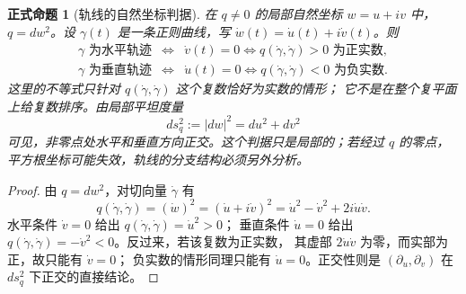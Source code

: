 \documentclass[UTF8,fontset=none,a4paper,11pt]{ctexart}
\theoremstyle{foundation-definition}
\theoremstyle{foundation-theorem}
\theoremstyle{foundation-proposition}
\newtheorem{proposition}[definition]{正式命题}
\theoremstyle{foundation-example}
\theoremstyle{foundation-remark}
\theoremstyle{foundation-theorem}
\begin{document}
\begin{proposition}[轨线的自然坐标判据]\label{prop:quadratic-trajectory-criterion}
在 \(q\neq0\) 的局部自然坐标 \(w=u+iv\) 中，\(q=dw^2\)。设
\(\gamma(t)\) 是一条正则曲线，写
\(\dot w(t)=\dot u(t)+i\dot v(t)\)。则
\[
\begin{array}{rcl}
\gamma\text{ 为水平轨迹}
&\Longleftrightarrow&
\dot v(t)=0
\Longleftrightarrow q(\dot\gamma,\dot\gamma)>0
\text{ 为正实数},\\[2pt]
\gamma\text{ 为垂直轨迹}
&\Longleftrightarrow&
\dot u(t)=0
\Longleftrightarrow q(\dot\gamma,\dot\gamma)<0
\text{ 为负实数}.
\end{array}
\]
这里的不等式只针对 \(q(\dot\gamma,\dot\gamma)\) 这个复数恰好为实数的情形；
它不是在整个复平面上给复数排序。由局部平坦度量
\[
ds_q^2:=|dw|^2=du^2+dv^2
\]
可见，非零点处水平和垂直方向正交。这个判据只是局部的；若经过
\(q\) 的零点，平方根坐标可能失效，轨线的分支结构必须另外分析。
\end{proposition}

\begin{proof}
由 \(q=dw^2\)，对切向量 \(\dot\gamma\) 有
\[
q(\dot\gamma,\dot\gamma)
=(\dot w)^2
=(\dot u+i\dot v)^2
=\dot u^2-\dot v^2+2i\dot u\dot v.
\]
水平条件 \(\dot v=0\) 给出 \(q(\dot\gamma,\dot\gamma)=\dot u^2>0\)；
垂直条件 \(\dot u=0\) 给出
\(q(\dot\gamma,\dot\gamma)=-\dot v^2<0\)。反过来，若该复数为正实数，
其虚部 \(2\dot u\dot v\) 为零，而实部为正，故只能有 \(\dot v=0\)；
负实数的情形同理只能有 \(\dot u=0\)。正交性则是
\((\partial_u,\partial_v)\) 在 \(ds_q^2\) 下正交的直接结论。
\end{proof}
\end{document}

